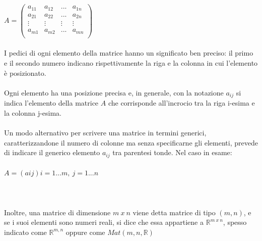 \documentclass{report}
\begin{document}
\\
\\
$ 
A=\begin{pmatrix}
  a_{11} & a_{12} & ... & a_{1n} \\
  a_{21} & a_{22} & ... & a_{2n} \\
  \vdots & \vdots & \vdots & \vdots \\
  a_{m1} & a_{m2} & ... & a_{mn} \\
\end{pmatrix}
$
\\
\\
I pedici di ogni elemento della matrice hanno un significato ben preciso: il primo e il secondo numero indicano rispettivamente la riga e la colonna in cui l'elemento è posizionato.
\\
\\
Ogni elemento ha una posizione precisa e, in generale, con la notazione $ a_{ij} $ si indica l'elemento della matrice $ A $ che corrisponde all'incrocio tra la riga i-esima e la colonna j-esima.
\\ 
\\
Un modo alternativo per scrivere una matrice in termini generici, caratterizzandone il numero di colonne ma senza specificarne gli elementi, prevede di indicare il generico elemento $ a_{ij} $ tra parentesi tonde. Nel caso in esame:
\\
\\
$ A = (a{ij})i=1...m, \ j=1...n $
\\
\\
\\
\\
Inoltre, una matrice di dimensione $m \ x \ n$ viene detta matrice di tipo $ (m,n) $, e se i suoi elementi sono numeri reali, si dice che essa appartiene a $\mathbb{R}^{m \ x \ n}$, spesso indicato come $ \mathbb{R}^{m,n} $ oppure come $Mat(m,n,\mathbb{R})$
\\
\\
\\
\end{document}
